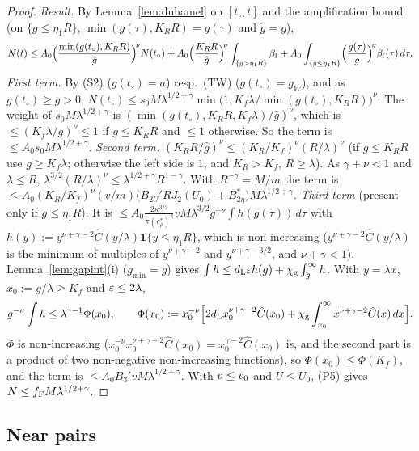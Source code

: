 \begin{proof}
\emph{Result.} By Lemma~\ref{lem:duhamel} on $[t_\circ,t]$ and the amplification bound (on $\{g\le\eta_1R\}$, $\min(g(\tau),K_RR)=g(\tau)$
and $\hat g=g$),
\[
N(t)\le A_0\Bigl(\frac{\min(g(t_\circ),K_RR)}{\hat g}\Bigr)^{\!\nu}N(t_\circ)+A_0\Bigl(\frac{K_RR}{\hat g}\Bigr)^{\!\nu}
\int_{\{g>\eta_1R\}}\beta_{\mathrm f}+A_0\int_{\{g\le\eta_1R\}}\Bigl(\frac{g(\tau)}{g}\Bigr)^{\!\nu}\beta_{\mathrm f}(\tau)\,d\tau .
\]
\emph{First term.} By (S2) ($g(t_\circ)=a$) resp.\ (TW) ($g(t_\circ)=g_W$), and as $g(t_\circ)\ge g>0$,
$N(t_\circ)\le s_0M\lambda^{1/2+\gamma}\min\bigl(1,K_f\lambda/\min(g(t_\circ),K_RR)\bigr)^\nu$. The weight of $s_0M\lambda^{1/2+\gamma}$ is
$(\min(g(t_\circ),K_RR,K_f\lambda)/\hat g)^\nu$, which is $\le(K_f\lambda/g)^\nu\le1$ if $g\le K_RR$ and $\le1$ otherwise. So the term is
$\le A_0s_0M\lambda^{1/2+\gamma}$.
\emph{Second term.} $(K_RR/\hat g)^\nu\le(K_R/K_f)^\nu(R/\lambda)^\nu$ (if $g\le K_RR$ use $g\ge K_f\lambda$; otherwise the left side is $1$,
and $K_R>K_f$, $R\ge\lambda$). As $\gamma+\nu<1$ and $\lambda\le R$, $\lambda^{3/2}(R/\lambda)^\nu\le\lambda^{1/2+\gamma}R^{1-\gamma}$. With
$R^{-\gamma}=M/m$ the term is $\le A_0(K_R/K_f)^\nu(v/m)\bigl(B_{2U}'RJ_2(U_0)+B_{2\eta}^*\bigr)M\lambda^{1/2+\gamma}$.
\emph{Third term} (present only if $g\le\eta_1R$). It is $\le A_0\frac{2\kappa^{3/2}}{\pi(c_\rho^*)^3}vM\lambda^{3/2}g^{-\nu}\int h(g(\tau))\,d\tau$
with $h(y):=y^{\nu+\gamma-2}\hat C(y/\lambda)\mathbf 1\{y\le\eta_1R\}$, which is non-increasing ($y^{\nu+\gamma-2}\hat C(y/\lambda)$ is the
minimum of multiples of $y^{\nu+\gamma-2}$ and $y^{\nu+\gamma-3/2}$, and $\nu+\gamma<1$). Lemma~\ref{lem:gapint}(i) ($g_{\min}=g$) gives
$\int h\le d_{\mathrm L}\varepsilon h(g)+\chi_{\mathrm g}\int_g^\infty h$. With $y=\lambda x$, $x_0:=g/\lambda\ge K_f$ and $\varepsilon\le2\lambda$,
\[
g^{-\nu}\int h\le\lambda^{\gamma-1}\Phi(x_0),\qquad
\Phi(x_0):=x_0^{-\nu}\Bigl[2d_{\mathrm L} x_0^{\nu+\gamma-2}\hat C(x_0)+\chi_{\mathrm g}\int_{x_0}^\infty x^{\nu+\gamma-2}\hat C(x)\,dx\Bigr].
\]
$\Phi$ is non-increasing ($x_0^{-\nu}x_0^{\nu+\gamma-2}\hat C(x_0)=x_0^{\gamma-2}\hat C(x_0)$ is, and the second part is a product of two
non-negative non-increasing functions), so $\Phi(x_0)\le\Phi(K_f)$, and the term is $\le A_0B_3'vM\lambda^{1/2+\gamma}$.
With $v\le v_0$ and $U\le U_0$, (P5) gives $N\le f_{\mathrm F} M\lambda^{1/2+\gamma}$.
\end{proof}

\subsection{Near pairs}

